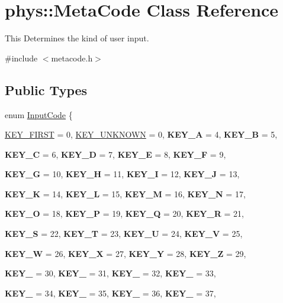 \hypertarget{classphys_1_1MetaCode}{
\section{phys::MetaCode Class Reference}
\label{da/dc9/classphys_1_1MetaCode}
}


This Determines the kind of user input.  




{\ttfamily \#include $<$metacode.h$>$}

\subsection*{Public Types}
\begin{DoxyCompactItemize}
\item 
enum \hyperlink{classphys_1_1MetaCode_a3e501cbb5bf0f6f1fdb7211465bda8d8}{InputCode} \{ \par
\hyperlink{classphys_1_1MetaCode_a3e501cbb5bf0f6f1fdb7211465bda8d8a45d7f3824a440f5bea5e616a6d6ea0b5}{KEY\_\-FIRST} =  0, 
\hyperlink{classphys_1_1MetaCode_a3e501cbb5bf0f6f1fdb7211465bda8d8a061a36c9b5d9661314fd9d276b33042f}{KEY\_\-UNKNOWN} =  0, 
{\bfseries KEY\_\-A} =  4, 
{\bfseries KEY\_\-B} =  5, 
\par
{\bfseries KEY\_\-C} =  6, 
{\bfseries KEY\_\-D} =  7, 
{\bfseries KEY\_\-E} =  8, 
{\bfseries KEY\_\-F} =  9, 
\par
{\bfseries KEY\_\-G} =  10, 
{\bfseries KEY\_\-H} =  11, 
{\bfseries KEY\_\-I} =  12, 
{\bfseries KEY\_\-J} =  13, 
\par
{\bfseries KEY\_\-K} =  14, 
{\bfseries KEY\_\-L} =  15, 
{\bfseries KEY\_\-M} =  16, 
{\bfseries KEY\_\-N} =  17, 
\par
{\bfseries KEY\_\-O} =  18, 
{\bfseries KEY\_\-P} =  19, 
{\bfseries KEY\_\-Q} =  20, 
{\bfseries KEY\_\-R} =  21, 
\par
{\bfseries KEY\_\-S} =  22, 
{\bfseries KEY\_\-T} =  23, 
{\bfseries KEY\_\-U} =  24, 
{\bfseries KEY\_\-V} =  25, 
\par
{\bfseries KEY\_\-W} =  26, 
{\bfseries KEY\_\-X} =  27, 
{\bfseries KEY\_\-Y} =  28, 
{\bfseries KEY\_\-Z} =  29, 
\par
{\bfseries KEY\_} =  30, 
{\bfseries KEY\_} =  31, 
{\bfseries KEY\_} =  32, 
{\bfseries KEY\_} =  33, 
\par
{\bfseries KEY\_} =  34, 
{\bfseries KEY\_} =  35, 
{\bfseries KEY\_} =  36, 
{\bfseries KEY\_} =  37, 
\par

\end{DoxyCompactItemize}
